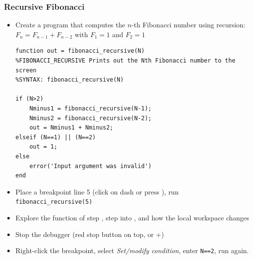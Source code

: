 {\nologo
\begin{frame}[fragile]
  \frametitle{Recursive Fibonacci}
  \begin{itemize}
    \item Create a program that computes the $n$-th Fibonacci number using recursion:\\
    $F_n = F_{n-1} + F_{n-2}$ with $F_1 = 1$ and $F_2 = 1$
    \pause
    \lstset{numbers=left}
  \begin{lstlisting}
function out = fibonacci_recursive(N)
%FIBONACCI_RECURSIVE Prints out the Nth Fibonacci number to the screen
%SYNTAX: fibonacci_recursive(N)

if (N>2)
    Nminus1 = fibonacci_recursive(N-1);
    Nminus2 = fibonacci_recursive(N-2);
    out = Nminus1 + Nminus2;
elseif (N==1) || (N==2)
    out = 1;
else
    error('Input argument was invalid')
end
  \end{lstlisting}
  \pause
    \item Place a breakpoint line 5 (click on dash or press ), run \lstinline$fibonacci_recursive(5)$
    \item Explore the function of step , step into , and how the local workspace changes
    \item Stop the debugger (red stop button on top, or +)
    \item Right-click the breakpoint, select \emph{Set/modify condition}, enter \lstinline$N==2$, run again.
  \end{itemize}
\end{frame}
}

